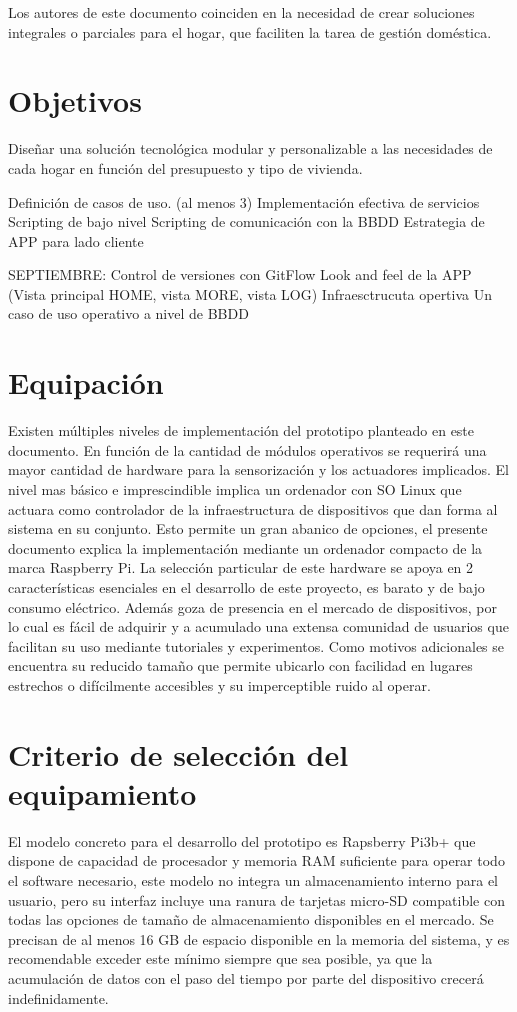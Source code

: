 Los autores de este documento coinciden en la necesidad de crear soluciones integrales o parciales para el hogar, que faciliten la tarea de gestión doméstica.


\section{Objetivos}
\label{makereference1.2}

Diseñar una solución tecnológica modular y personalizable a las necesidades de cada hogar en función del presupuesto y tipo de vivienda. 

Definición de casos de uso. (al menos 3)
Implementación efectiva de servicios
Scripting de bajo nivel
Scripting de comunicación con la BBDD	
Estrategia de APP para lado cliente

SEPTIEMBRE:
Control de versiones con GitFlow
Look and feel de la APP (Vista principal HOME, vista MORE, vista LOG)
Infraesctrucuta opertiva
Un caso de uso operativo a nivel de BBDD


\section{Equipación}
\label{makereference1.3}

Existen múltiples niveles de implementación del prototipo planteado en este documento. En función de la cantidad de módulos operativos se requerirá una mayor cantidad de hardware para la sensorización y los actuadores implicados. El nivel mas básico e imprescindible implica un ordenador con SO Linux que actuara como controlador de la infraestructura de dispositivos que dan forma al sistema en su conjunto. Esto permite un gran abanico de opciones, el presente documento explica la implementación mediante un ordenador compacto de la marca Raspberry Pi. La selección particular de este hardware se apoya en 2 características esenciales en el desarrollo de este proyecto, es barato y de bajo consumo eléctrico. Además goza de presencia en el mercado de dispositivos, por lo cual es fácil de adquirir y a acumulado una extensa comunidad de usuarios que facilitan su uso mediante tutoriales y experimentos. Como motivos adicionales se encuentra su reducido tamaño que permite ubicarlo con facilidad en lugares estrechos o difícilmente accesibles y su imperceptible ruido al operar.

\section{Criterio de selección del equipamiento}
\label{makereference1.4}
El modelo concreto para el desarrollo del prototipo es Rapsberry Pi3b+ que dispone de capacidad de procesador y memoria RAM suficiente para operar todo el software necesario, este modelo no integra un almacenamiento interno para el usuario, pero su interfaz incluye una ranura de tarjetas micro-SD compatible con todas las opciones de tamaño de almacenamiento disponibles en el mercado. Se precisan de al menos 16 GB de espacio disponible en la memoria del sistema, y es recomendable exceder este mínimo siempre que sea posible, ya que la acumulación de datos con el paso del tiempo por parte del dispositivo crecerá indefinidamente.


